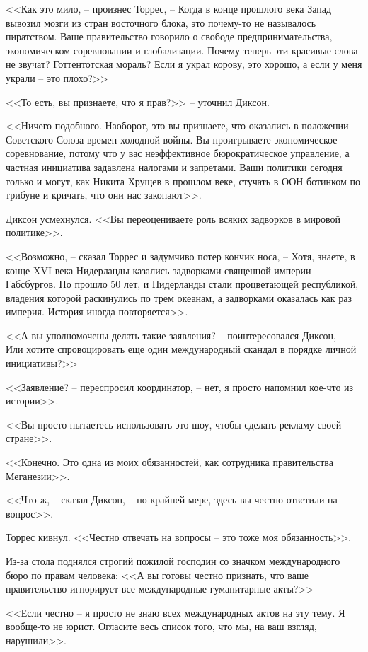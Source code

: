 <<Как это мило, -- произнес Торрес, -- Когда в конце прошлого века Запад вывозил мозги из стран восточного блока, это почему-то не называлось пиратством. Ваше правительство говорило о свободе предпринимательства, экономическом соревновании и глобализации. Почему теперь эти красивые слова не звучат? Готтентотская мораль? Если я украл корову, это хорошо, а если у меня украли -- это плохо?>>

<<То есть, вы признаете, что я прав?>> -- уточнил Диксон.

<<Ничего подобного. Наоборот, это вы признаете, что оказались в положении Советского Союза времен холодной войны. Вы проигрываете экономическое соревнование, потому что у вас неэффективное бюрократическое управление, а частная инициатива задавлена налогами и запретами. Ваши политики сегодня только и могут, как Никита Хрущев в прошлом веке, стучать в ООН ботинком по трибуне и кричать, что они нас закопают>>.

Диксон усмехнулся. <<Вы переоцениваете роль всяких задворков в мировой политике>>.

<<Возможно, -- сказал Торрес и задумчиво потер кончик носа, -- Хотя, знаете, в конце XVI века Нидерланды казались задворками священной империи Габсбургов. Но прошло 50 лет, и Нидерланды стали процветающей республикой, владения которой раскинулись по трем океанам, а задворками оказалась как раз империя. История иногда повторяется>>.

<<А вы уполномочены делать такие заявления? -- поинтересовался Диксон, -- Или хотите спровоцировать еще один международный скандал в порядке личной инициативы?>>

<<Заявление? -- переспросил координатор, -- нет, я просто напомнил кое-что из истории>>.

<<Вы просто пытаетесь использовать это шоу, чтобы сделать рекламу своей стране>>.

<<Конечно. Это одна из моих обязанностей, как сотрудника правительства Меганезии>>.

<<Что ж, -- сказал Диксон, -- по крайней мере, здесь вы честно ответили на вопрос>>.

Торрес кивнул. <<Честно отвечать на вопросы -- это тоже моя обязанность>>.

Из-за стола поднялся строгий пожилой господин со значком международного бюро по правам человека: <<А вы готовы честно признать, что ваше правительство игнорирует все международные гуманитарные акты?>>

<<Если честно -- я просто не знаю всех международных актов на эту тему. Я вообще-то не юрист. Огласите весь список того, что мы, на ваш взгляд, нарушили>>.

